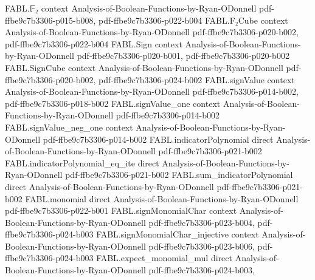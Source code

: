 \begin{theorem}
\label{FABL.hastadAcceptanceProbability_dictator}
\leanok
{}
\proofstep
  {FABL.𝔽₂}
  {context}
  {Analysis-of-Boolean-Functions-by-Ryan-ODonnell}
  {pdf-ffbe9c7b3306-p015-b008,
    pdf-ffbe9c7b3306-p022-b004}
\proofstep
  {FABL.F₂Cube}
  {context}
  {Analysis-of-Boolean-Functions-by-Ryan-ODonnell}
  {pdf-ffbe9c7b3306-p020-b002,
    pdf-ffbe9c7b3306-p022-b004}
\proofstep
  {FABL.Sign}
  {context}
  {Analysis-of-Boolean-Functions-by-Ryan-ODonnell}
  {pdf-ffbe9c7b3306-p020-b001,
    pdf-ffbe9c7b3306-p020-b002}
\proofstep
  {FABL.SignCube}
  {context}
  {Analysis-of-Boolean-Functions-by-Ryan-ODonnell}
  {pdf-ffbe9c7b3306-p020-b002,
    pdf-ffbe9c7b3306-p024-b002}
\proofstep
  {FABL.signValue}
  {context}
  {Analysis-of-Boolean-Functions-by-Ryan-ODonnell}
  {pdf-ffbe9c7b3306-p014-b002,
    pdf-ffbe9c7b3306-p018-b002}
\proofstep
  {FABL.signValue_one}
  {context}
  {Analysis-of-Boolean-Functions-by-Ryan-ODonnell}
  {pdf-ffbe9c7b3306-p014-b002}
\proofstep
  {FABL.signValue_neg_one}
  {context}
  {Analysis-of-Boolean-Functions-by-Ryan-ODonnell}
  {pdf-ffbe9c7b3306-p014-b002}
\proofstep
  {FABL.indicatorPolynomial}
  {direct}
  {Analysis-of-Boolean-Functions-by-Ryan-ODonnell}
  {pdf-ffbe9c7b3306-p021-b002}
\proofstep
  {FABL.indicatorPolynomial_eq_ite}
  {direct}
  {Analysis-of-Boolean-Functions-by-Ryan-ODonnell}
  {pdf-ffbe9c7b3306-p021-b002}
\proofstep
  {FABL.sum_indicatorPolynomial}
  {direct}
  {Analysis-of-Boolean-Functions-by-Ryan-ODonnell}
  {pdf-ffbe9c7b3306-p021-b002}
\proofstep
  {FABL.monomial}
  {direct}
  {Analysis-of-Boolean-Functions-by-Ryan-ODonnell}
  {pdf-ffbe9c7b3306-p022-b001}
\proofstep
  {FABL.signMonomialChar}
  {context}
  {Analysis-of-Boolean-Functions-by-Ryan-ODonnell}
  {pdf-ffbe9c7b3306-p023-b004,
    pdf-ffbe9c7b3306-p024-b003}
\proofstep
  {FABL.signMonomialChar_injective}
  {context}
  {Analysis-of-Boolean-Functions-by-Ryan-ODonnell}
  {pdf-ffbe9c7b3306-p023-b006,
    pdf-ffbe9c7b3306-p024-b003}
\proofstep
  {FABL.expect_monomial_mul}
  {direct}
  {Analysis-of-Boolean-Functions-by-Ryan-ODonnell}
  {pdf-ffbe9c7b3306-p024-b003,
}
\end{theorem}
